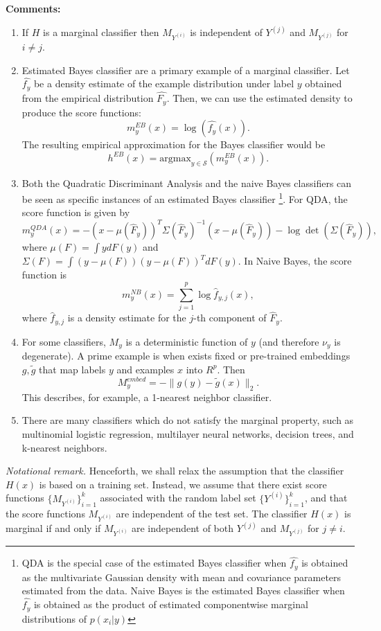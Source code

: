 \documentclass[twoside,11pt]{article}
\begin{document}
\textbf{Comments:}
\begin{enumerate}
\item If $H$ is a marginal classifier then 
$M_{Y^{(i)}}$ is independent of $Y^{(j)}$ and $M_{Y^{(j)}}$ for $i \neq j$.
\item Estimated Bayes classifier are a primary example of a marginal
  classifier. Let $\hat{f_y}$ be a density estimate of the example
  distribution under label $y$ obtained from the empirical
  distribution $\hat{F_y}$. Then, we can use the estimated density to
  produce the score functions:
\[ m^{EB}_y(x) = \log(\hat{f_{y}}(x)).\]
The resulting empirical approximation for the Bayes classifier would
be
\[ h^{EB}(x) = \text{argmax}_{y \in \mathcal{S}}(m^{EB}_y(x)).\]
\item Both the Quadratic Discriminant Analysis and the naive Bayes
  classifiers can be seen as specific instances of an estimated Bayes
  classifier
\footnote{QDA is the special case of the estimated Bayes classifier
  when $\hat{f_y}$ is obtained as the multivariate Gaussian density
  with mean and covariance parameters estimated from the data.  Naive
  Bayes is the estimated Bayes classifier when $\hat{f_y}$ is obtained
  as the product of estimated componentwise marginal distributions of
  $p(x_i|y)$}.  For QDA, the score function is given by
\[
m_y^{QDA}(x) = -(x - \mu(\hat{F}_y))^T \Sigma(\hat{F}_y)^{-1} (x-\mu(\hat{F}_y)) - \log\det(\Sigma(\hat{F}_y)),
\]
where $\mu(F) = \int y dF(y)$ and $\Sigma(F) = \int (y-\mu(F))(y-\mu(F))^T dF(y)$.
In Naive Bayes, the score function is
\[
m^{NB}_y(x) = \sum_{j=1}^p \log \hat{f}_{y, j}(x),
\]
where $\hat{f}_{y, j}$ is a density estimate for the $j$-th component of
$\hat{F}_y$.
\item For some classifiers, $M_y$ is a deterministic function of $y$
  (and therefore $\nu_y$ is degenerate). A prime example is when
  exists fixed or pre-trained embeddings $g, \tilde{g}$ that map
  labels $y$ and examples $x$ into $R^p$. Then
\begin{equation}
M_y^{embed} = -\|g(y) - \tilde{g}(x)\|_2.
\end{equation}
This describes, for example, a 1-nearest neighbor classifier.
\item There are many classifiers which do not satisfy the marginal
  property, such as multinomial logistic regression, multilayer neural
  networks, decision trees, and k-nearest neighbors.
\end{enumerate}

\emph{Notational remark.}  Henceforth, we shall relax the assumption
that the classifier $H(x)$ is based on a training set.  Instead, we
assume that there exist score functions $\{M_{Y^{(i)}}\}_{i=1}^k$
associated with the random label set $\{Y^{(i)}\}_{i=1}^k$, and that
the score functions $M_{Y^{(i)}}$ are independent of the test set.
The classifier $H(x)$ is marginal if and only if $M_{Y^{(i)}}$ are
independent of both $Y^{(j)}$ and $M_{Y^{(j)}}$ for $j \neq i$.
\end{document}
